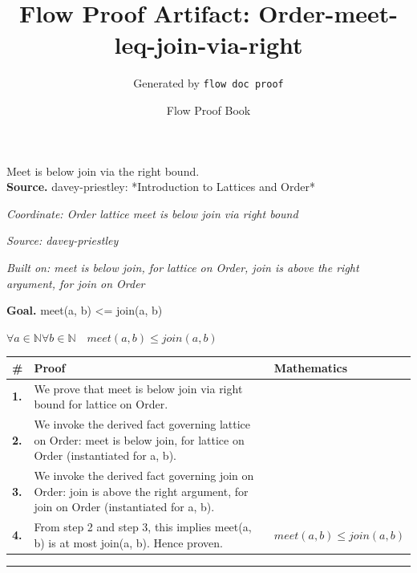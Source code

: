 \documentclass[11pt]{article}
\title{Flow Proof Artifact: Order-meet-leq-join-via-right}
\author{Generated by \texttt{flow doc proof}}
\date{Flow Proof Book}
\theoremstyle{definition}
\begin{document}
\maketitle
Meet is below join via the right bound.\\[0.5em]
\textbf{Source.} davey-priestley: *Introduction to Lattices and Order*\\[0.5em]
\bigskip
{}\par
\smallskip\noindent\textit{Coordinate: Order \cdot lattice \cdot meet is below join via right bound}\par
\smallskip\noindent\textit{Source: davey-priestley}\par
\smallskip\noindent\textit{Built on: meet is below join, for lattice on Order, join is above the right argument, for join on Order}\par
\medskip
\noindent\textbf{Goal.} meet(a, b) <= join(a, b)\par
\noindent$\displaystyle \forall a \in \mathbb{N} \forall b \in \mathbb{N}\quad meet(a, b) \le join(a, b)$\par
\medskip
\noindent
\begin{tabular}{@{} >{\raggedright\arraybackslash}p{} >{\raggedright\arraybackslash}p{} >{\raggedleft\arraybackslash}p{} @{}}
\textbf{\#} & \textbf{Proof} & \textbf{Mathematics} \\
\midrule
\textbf{1.} & We prove that meet is below join via right bound for lattice on Order. & \\[0.45em]
\textbf{2.} & We invoke the derived fact governing lattice on Order: meet is below join, for lattice on Order (instantiated for a, b). & \\[0.45em]
\textbf{3.} & We invoke the derived fact governing join on Order: join is above the right argument, for join on Order (instantiated for a, b). & \\[0.45em]
\textbf{4.} & From step 2 and step 3, this implies meet(a, b) is at most join(a, b). Hence proven. & $\displaystyle meet(a, b) \le join(a, b)$ \\[0.45em]
\bottomrule
\end{tabular}
\label{thm:Order-lattice-meet_is_below_join_via_right_bound}
\par\medskip\hrule
\end{document}

